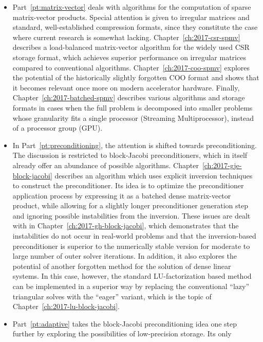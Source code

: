 \begin{itemize}
\item Part~\ref{pt:matrix-vector} deals with algorithms for the computation of
sparse matrix-vector products. Special attention is given to irregular matrices
and standard, well-established compression formats, since they constitute the
case where current research is somewhat lacking. Chapter~\ref{ch:2017-csr-spmv}
describes a load-balanced matrix-vector algorithm for the widely used CSR
storage format, which achieves superior performance on irregular matrices
compared to conventional algorithms. Chapter~\ref{ch:2017-coo-spmv} explores the
potential of the historically slightly   forgotten COO format and shows that it
becomes relevant once more on modern accelerator hardware. Finally,
Chapter~\ref{ch:2017-batched-spmv} describes various algorithms and storage
formats in cases when the full problem is decomposed into smaller problems whose
granularity fits a single processor (\ie Streaming Multiprocessor), instead of a
processor group (\ie GPU).
\item In Part~\ref{pt:preconditioning}, the attention is shifted towards
preconditioning. The discussion is restricted to block-Jacobi preconditioners,
which in itself already offer an abundance of possible algorithms.
Chapter~\ref{ch:2017-gje-block-jacobi} describes an algorithm which uses
explicit inversion techniques to construct the preconditioner. Its idea is to
optimize the preconditioner application process by expressing it as a batched
dense matrix-vector product, while allowing for a slightly longer preconditioner
generation step and ignoring possible instabilities from the inversion. These
issues are dealt with in Chapter~\ref{ch:2017-gh-block-jacobi}, which
demonstrates that the instabilities do not occur in real-world problems and that
the inversion-based preconditioner is superior to the numerically stable version
for moderate to large number of outer solver iterations. In addition, it also
explores the potential of another forgotten method for the solution of dense
linear systems. In this case, however, the standard LU-factorization based
method can be implemented in a superior way by replacing the conventional
``lazy'' triangular solves with the ``eager'' variant, which is the topic of
Chapter~\ref{ch:2017-lu-block-jacobi}.
\item Part~\ref{pt:adaptive} takes the block-Jacobi preconditioning idea one
step further by exploring the possibilities of low-precision storage. Its only

\end{itemize}

